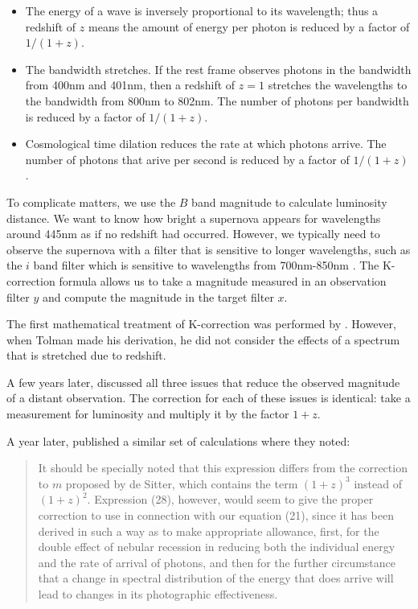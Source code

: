 \documentclass[aps,prl,reprint,amsmath]{revtex4-2}
\begin{document}
\begin{itemize}
  \item The energy of a wave is inversely proportional to its wavelength; thus a
  redshift of $z$ means the amount of energy per photon is reduced by a factor
  of $1 / (1+z)$.

  \item The bandwidth stretches. If the rest frame observes photons in the
  bandwidth from 400nm and 401nm, then a redshift of $z = 1$ stretches the
  wavelengths to the bandwidth from 800nm to 802nm. The number of photons per
  bandwidth is reduced by a factor of $1 / (1+z)$.

  \item Cosmological time dilation reduces the rate at which photons arrive.
  The number of photons that arive per second is reduced by a factor of $1 / (1+z)$.
\end{itemize}

To complicate matters, we use the $B$ band magnitude to calculate luminosity
distance. We want to know how bright a supernova appears for wavelengths around
445nm as if no redshift had occurred. However, we typically need to observe the
supernova with a filter that is sensitive to longer wavelengths, such as the
$i$ band filter which is sensitive to wavelengths from 700nm-850nm
\citep{flaugher2015}. The K-correction formula allows us to take a magnitude
measured in an observation filter $y$ and compute the magnitude in the target
filter $x$.

The first mathematical treatment of K-correction was performed by
\citet{tolman1930}. However, when Tolman made his derivation, he did not
consider the effects of a spectrum that is stretched due to redshift.

A few years later, \citet{desitter1934} discussed all three issues that reduce
the observed magnitude of a distant observation. The correction for each of
these issues is identical: take a measurement for luminosity and multiply it by
the factor $1 + z$.

A year later, \citet{hubble1935} published a similar set of calculations where they noted:

\begin{quote}
It should be specially noted that this expression differs from the correction
to $m$ proposed by de Sitter, which contains the term $(1 + z)^3$ instead of
$(1 + z)^2$. Expression (28), however, would seem to give the proper correction
to use in connection with our equation (21), since it has been derived in such
a way as to make appropriate allowance, first, for the double effect of nebular
recession in reducing both the individual energy and the rate of arrival of
photons, and then for the further circumstance that a change in spectral
distribution of the energy that does arrive will lead to changes in its
photographic effectiveness.
\end{quote}
\end{document}

